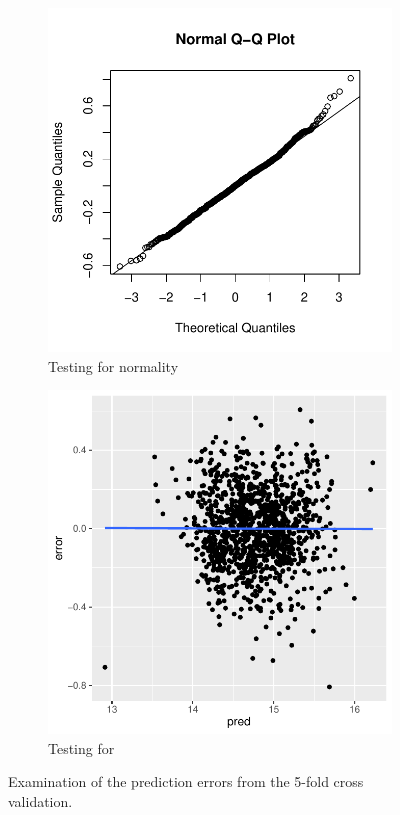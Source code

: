 \begin{figure}[H]
\centering
\begin{subfigure}[b]{0.5\textwidth}
    \centering
    \includegraphics[width = \textwidth]{figures/Nanna/Normal.pdf}
    \caption{Testing for normality}
    \label{fig:cv_normal}
\end{subfigure}%
\begin{subfigure}[b]{0.5\textwidth}
\centering
    \includegraphics[width = \textwidth]{figures/Nanna/cv_normal_homo.pdf}
    \caption{Testing for \hetero}
    \label{fig:cv_homo}
\end{subfigure}
\caption{Examination of the prediction errors from the 5-fold cross validation.}
\label{fig:cv_normal_homo}
\end{figure}

